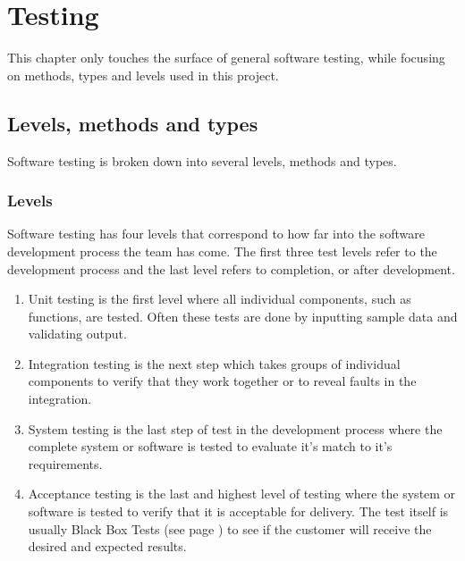 \chapter{Testing}
This chapter only touches the surface of general software testing, while focusing on methods, types and levels used in this project.
\section{Levels, methods and types}
Software testing is broken down into several levels, methods and types.
\subsection{Levels}
Software testing has four levels that correspond to how far into the software development process the team has come. The first three test levels refer to the development process and the last level refers to completion, or after development.
\begin{enumerate}
\item Unit testing is the first level where all individual components, such as functions, are tested. Often these tests are done by inputting sample data and validating output.
\item Integration testing is the next step which takes groups of individual components to verify that they work together or to reveal faults in the integration.
\item System testing is the last step of test in the development process where the complete system or software is tested to evaluate it's match to it's requirements.
\item Acceptance testing is the last and highest level of testing where the system or software is tested to verify that it is acceptable for delivery. The test itself is usually Black Box Tests (see page \pageref{def:blackboxtesting}) to see if the customer will receive the desired and expected results.
\end{enumerate}

